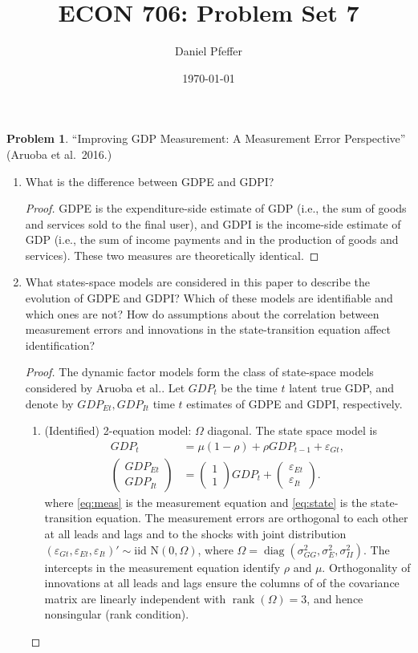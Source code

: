 \documentclass[oneside,reqno]{amsart}
\title{ECON 706: Problem Set 7}
\author{Daniel Pfeffer}
\date{\today}
\DeclareMathOperator{\diag}{diag}
\DeclareMathOperator{\rank}{rank}
\newcommand{\eps}{\varepsilon}
\newcommand{\N}{\mathrm N}
\theoremstyle{definition}
\newtheorem{prob}{Problem}
\begin{document}
\maketitle

\begin{prob}
``Improving GDP Measurement: A Measurement Error Perspective'' (Aruoba et al.\ 2016.)
\end{prob}

\begin{enumerate}[label=(\roman*)]
\item
What is the difference between GDPE and GDPI?
\begin{proof}
GDPE is the expenditure-side estimate of GDP  (i.e., the sum of goods and services sold to the final user), and GDPI is the income-side estimate of GDP (i.e., the sum of income payments and  in the production of goods and services). These two measures are theoretically identical.
\end{proof}
\item
What states-space models are considered in this paper to describe the
evolution of GDPE and GDPI? Which of these models are identifiable and which ones are not? How do assumptions about the correlation between measurement errors and innovations in the state-transition equation affect identification?
\begin{proof}
The dynamic factor models form the class of state-space models considered by Aruoba et al.. Let $GDP_t$ be the time $t$ latent true GDP, and denote by $GDP_{Et}, GDP_{It}$ time $t$ estimates of GDPE and GDPI, respectively.  
\leavevmode
\begin{enumerate}[label=(\arabic*)]
\item
(Identified) 2-equation model: $\Omega$ diagonal. The state space model is 
\begin{align}
	GDP_t &= \mu(1-\rho) + \rho GDP_{t-1} + \eps_{Gt}, \label{eq:state} \\
	\begin{pmatrix}
		GDP_{Et}  \\ GDP_{It}
	\end{pmatrix} 
	&= \begin{pmatrix}
		1 \\ 1
	\end{pmatrix} GDP_t
	+ \begin{pmatrix}
		\eps_{Et} \\ \eps_{It}
	\end{pmatrix}  \label{eq:meas}.
\end{align}
where \eqref{eq:meas} is the measurement equation and \eqref{eq:state} is the state-transition equation. The measurement errors are orthogonal to each other at all leads and lags and to the shocks with joint distribution $(\eps_{Gt}, \eps_{Et}, \eps_{It})' \sim \text{iid } \N(0, \Omega)$, where $\Omega = \diag(\sigma_{GG}^2, \sigma_E^2, \sigma_{II}^2)$. The intercepts in the measurement equation identify $\rho$ and $\mu$. Orthogonality of innovations at all leads and lags ensure the columns of of the covariance matrix are linearly independent with $\rank(\Omega) = 3$, and hence nonsingular (rank condition).

\end{enumerate}
\end{proof}
\end{enumerate}
\end{document}
